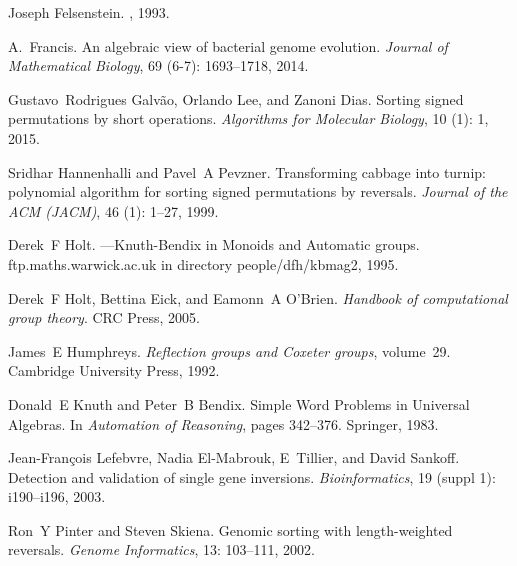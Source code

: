 \documentclass[12pt,a4paper]{amsart}
\numberwithin{equation}{section}
\begin{document}
\begin{thebibliography}{38}
Joseph Felsenstein.
, 1993.

A.~Francis.
\newblock An algebraic view of bacterial genome evolution.
\newblock \emph{Journal of Mathematical Biology}, 69 (6-7):
  1693--1718, 2014.

Gustavo~Rodrigues Galv{\~a}o, Orlando Lee, and Zanoni Dias.
\newblock Sorting signed permutations by short operations.
\newblock \emph{Algorithms for Molecular Biology}, 10 (1): 1,
  2015.

Sridhar Hannenhalli and Pavel~A Pevzner.
\newblock Transforming cabbage into turnip: polynomial algorithm for sorting
  signed permutations by reversals.
\newblock \emph{Journal of the ACM (JACM)}, 46 (1): 1--27,
  1999.

Derek~F Holt.
---{K}nuth-{B}endix in {M}onoids and {A}utomatic groups.
\newblock ftp.maths.warwick.ac.uk in directory people/dfh/kbmag2, 1995.

Derek~F Holt, Bettina Eick, and Eamonn~A O'Brien.
\newblock \emph{Handbook of computational group theory}.
\newblock CRC Press, 2005.

James~E Humphreys.
\newblock \emph{Reflection groups and Coxeter groups}, volume~29.
\newblock Cambridge University Press, 1992.

Donald~E Knuth and Peter~B Bendix.
\newblock Simple {W}ord {P}roblems in {U}niversal {A}lgebras.
\newblock In \emph{Automation of Reasoning}, pages 342--376. Springer, 1983.

Jean-Fran{\c{c}}ois Lefebvre, Nadia El-Mabrouk, E~Tillier, and David Sankoff.
\newblock Detection and validation of single gene inversions.
\newblock \emph{Bioinformatics}, 19 (suppl 1): i190--i196,
  2003.

Ron~Y Pinter and Steven Skiena.
\newblock Genomic sorting with length-weighted reversals.
\newblock \emph{Genome Informatics}, 13: 103--111, 2002.


\end{thebibliography}
\end{document}
